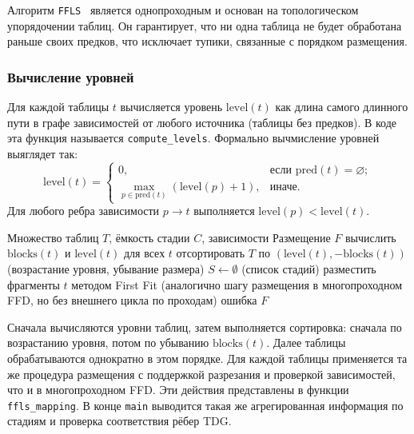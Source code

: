 Алгоритм \texttt{FFLS}~\cite{jose2015compiling} является однопроходным и основан на топологическом упорядочении таблиц. Он гарантирует, что ни одна таблица не будет обработана раньше своих предков, что исключает тупики, связанные с порядком размещения.

\subsubsection{Вычисление уровней}

Для каждой таблицы $t$ вычисляется уровень $\text{level}(t)$ как длина самого длинного пути в графе зависимостей от любого источника (таблицы без предков). В коде эта функция называется \texttt{compute\_levels}. Формально вычмисление уровней выяглядет так:
\[
\text{level}(t) = 
\begin{cases}
	0, & \text{если } \text{pred}(t) = \varnothing;\\
	\max\limits_{p \in \text{pred}(t)} (\text{level}(p) + 1), & \text{иначе}.
\end{cases}
\]
Для любого ребра зависимости $p \to t$ выполняется $\text{level}(p) < \text{level}(t)$.


\begin{algorithm}[H]
	\caption{FFLS с разрезанием}
	\begin{algorithmic}[1]
		\REQUIRE Множество таблиц $T$, ёмкость стадии $C$, зависимости
		\ENSURE Размещение $F$
		\STATE вычислить $\text{blocks}(t)$ и $\text{level}(t)$ для всех $t$
		\STATE отсортировать $T$ по $(\text{level}(t), -\text{blocks}(t))$ (возрастание уровня, убывание размера)
		\STATE $S \gets \emptyset$ (список стадий)
		\STATE разместить фрагменты $t$ методом First Fit (аналогично шагу размещения в многопроходном FFD, но без внешнего цикла по проходам)
		 \RETURN ошибка \ENDIF
		\ENDFOR
		\RETURN $F$
	\end{algorithmic}
\end{algorithm}


Сначала вычисляются уровни таблиц, затем выполняется сортировка: сначала по возрастанию уровня, потом по убыванию $\text{blocks}(t)$. Далее таблицы обрабатываются однократно в этом порядке. Для каждой таблицы применяется та же процедура размещения с поддержкой разрезания и проверкой зависимостей, что и в многопроходном FFD.
 Эти действия представлены в функции \texttt{ffls\_mapping}. В конце \texttt{main} выводится такая же агрегированная информация по стадиям и проверка соответствия рёбер TDG.

